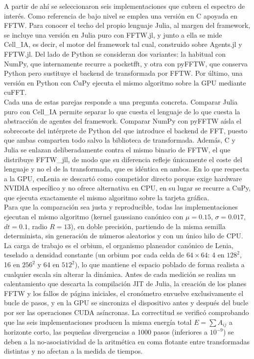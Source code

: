 \documentclass[runningheads]{llncs}
\begin{document}
A partir de ahí se seleccionaron seis implementaciones que cubren el espectro de interés. Como referencia de bajo nivel se emplea una versión en C apoyada en FFTW. Para conocer el techo del propio lenguaje Julia, al margen del framework, se incluye una versión en Julia puro con FFTW.jl, y junto a ella se mide Cell\_IA, es decir, el motor del framework tal cual, construido sobre Agents.jl y FFTW.jl. Del lado de Python se consideran dos variantes: la habitual con NumPy, que internamente recurre a pocketfft, y otra con pyFFTW, que conserva Python pero sustituye el backend de transformada por FFTW. Por último, una versión en Python con CuPy ejecuta el mismo algoritmo sobre la GPU mediante cuFFT.\\

Cada una de estas parejas responde a una pregunta concreta. Comparar Julia puro con Cell\_IA permite separar lo que cuesta el lenguaje de lo que cuesta la abstracción de agentes del framework. Comparar NumPy con pyFFTW aísla el sobrecoste del intérprete de Python del que introduce el backend de FFT, puesto que ambas comparten todo salvo la biblioteca de transformada. Además, C y Julia se enlazan deliberadamente contra el mismo binario de FFTW, el que distribuye FFTW\_jll, de modo que su diferencia refleje únicamente el coste del lenguaje y no el de la transformada, que es idéntica en ambos. En lo que respecta a la GPU, cuLenia se descartó como competidor directo porque exige hardware NVIDIA específico y no ofrece alternativa en CPU, en su lugar se recurre a CuPy, que ejecuta exactamente el mismo algoritmo sobre la tarjeta gráfica.\\

Para que la comparación sea justa y reproducible, todas las implementaciones ejecutan el mismo algoritmo (kernel gaussiano canónico con $\mu=0.15$, $\sigma=0.017$, $dt=0.1$, radio $R=13$), en doble precisión, partiendo de la misma semilla determinista, sin generación de números aleatorios y con un único hilo de CPU. La carga de trabajo es el orbium, el organismo planeador canónico de Lenia, teselado a densidad constante (un orbium por cada celda de $64\times64$: 4 en $128^2$, 16 en $256^2$ y 64 en $512^2$), lo que mantiene el espacio poblado de forma realista a cualquier escala sin alterar la dinámica. Antes de cada medición se realiza un calentamiento que descarta la compilación JIT de Julia, la creación de los planes FFTW y los fallos de página iniciales, el cronómetro envuelve exclusivamente el bucle de pasos, y en la GPU se sincroniza el dispositivo antes y después del bucle por ser las operaciones CUDA asíncronas. La correctitud se verificó comprobando que las seis implementaciones producen la misma energía total $E=\sum A_{ij}$ a horizonte corto, las pequeñas divergencias a 1000 pasos (inferiores a $10^{-9}$) se deben a la no-asociatividad de la aritmética en coma flotante entre transformadas distintas y no afectan a la medida de tiempos.\\
\end{document}
